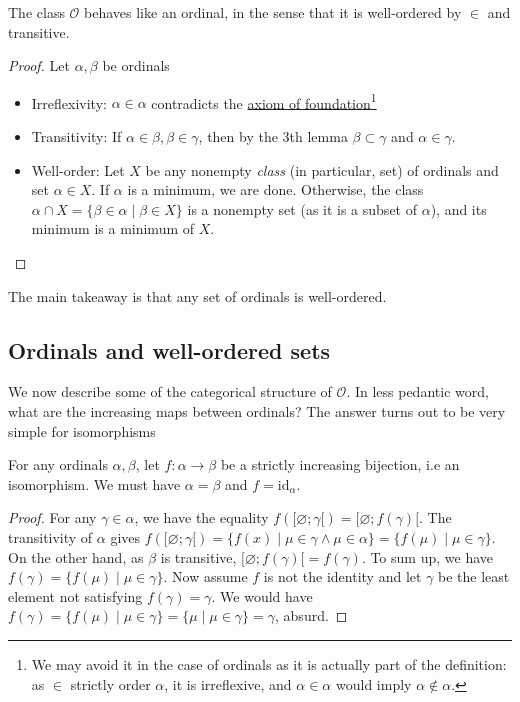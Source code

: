 \documentclass{article}
\begin{document}
\begin{theorem}
    The class $\mathcal{O}$ behaves like an ordinal, in the sense that it is well-ordered by $\in$ and transitive. 
\end{theorem}
\begin{proof}
    Let $\alpha, \beta$ be ordinals
    \begin{itemize}
        \item Irreflexivity: $\alpha \in \alpha$ contradicts the \href{https://en.wikipedia.org/wiki/Axiom_of_regularity#No_set_is_an_element_of_itself}{axiom of foundation}\footnote{We may avoid it in the case of ordinals as it is actually part of the definition: as $\in$ strictly order $\alpha$, it is irreflexive, and $\alpha \in \alpha$ would imply $\alpha \not\in \alpha$.}
        \item Transitivity: If $\alpha \in \beta, \beta \in \gamma$, then by the 3th lemma $\beta \subset \gamma$ and $\alpha \in \gamma$.
        \item Well-order: Let $X$ be any nonempty \textit{class} (in particular, set) of ordinals and set $\alpha \in X$. If $\alpha$ is a minimum, we are done. Otherwise, the class $\alpha \cap X = \{\beta \in \alpha \mid \beta \in X\}$ is a nonempty set (as it is a subset of $\alpha$), and its minimum is a minimum of $X$.
    \end{itemize}
\end{proof}
The main takeaway is that any set of ordinals is well-ordered. 


\subsection{Ordinals and well-ordered sets}

We now describe some of the categorical structure of $\mathcal{O}$. In less pedantic word, what are the increasing maps between ordinals? The answer turns out to be very simple for isomorphisms
\begin{proposition}
    For any ordinals $\alpha, \beta$, let $f: \alpha \to \beta$ be a strictly increasing bijection, i.e an isomorphism. We must have $\alpha = \beta$ and $f = \mathrm{id}_\alpha$.
\end{proposition}
\begin{proof}
    For any $\gamma \in \alpha$, we have the equality $f([\varnothing; \gamma[) = [\varnothing; f(\gamma)[$. The transitivity of $\alpha$ gives $f([\varnothing; \gamma[) = \{f(x) \mid \mu \in \gamma \land \mu \in \alpha\} = \{f(\mu) \mid \mu \in \gamma\}$. On the other hand, as $\beta$ is transitive, $[\varnothing; f(\gamma)[ = f(\gamma)$. To sum up, we have $f(\gamma) = \{f(\mu) \mid \mu \in \gamma\}$. Now assume $f$ is not the identity and let $\gamma$ be the least element not satisfying $f(\gamma) = \gamma$. We would have $f(\gamma) = \{f(\mu) \mid \mu \in \gamma\} = \{\mu \mid \mu \in \gamma\} = \gamma$, absurd.
\end{proof}
\end{document}
